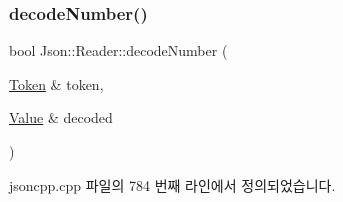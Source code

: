 \subsubsection{\texorpdfstring{decode\+Number()}{decodeNumber()}\hspace{0.1cm}{\footnotesize\ttfamily [2/2]}}
{\footnotesize\ttfamily bool Json\+::\+Reader\+::decode\+Number (\begin{DoxyParamCaption}\item[{\hyperlink{class_json_1_1_reader_1_1_token}{Token} \&}]{token,  }\item[{\hyperlink{class_json_1_1_value}{Value} \&}]{decoded }\end{DoxyParamCaption})\hspace{0.3cm}{\ttfamily [private]}}



jsoncpp.\+cpp 파일의 784 번째 라인에서 정의되었습니다.


